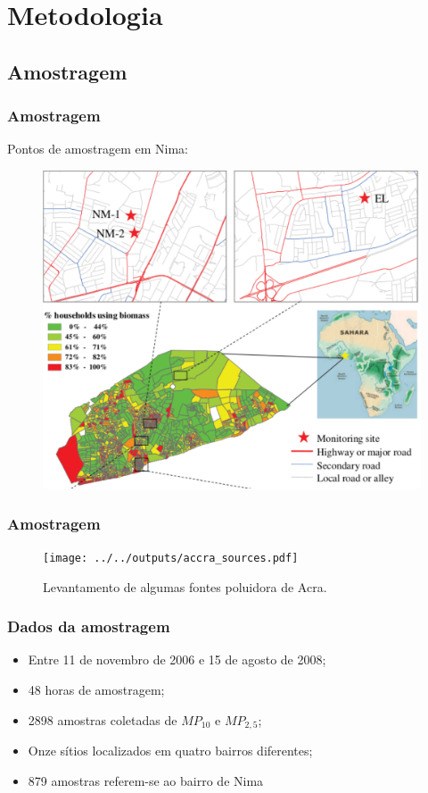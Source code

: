 \section{Metodologia}

\subsection{Amostragem}
\begin{frame}
  \frametitle{Amostragem}
 \begin{center}
  Pontos de amostragem em Nima:
 \end{center}
  \begin{figure}[H]
    \centering
    \includegraphics[scale=0.35]{../../inputs/images/zheng/nima_mapa.pdf}
  \end{figure}
\end{frame}

\begin{frame}
  \frametitle{Amostragem}
  \begin{figure}[H]
  \centering	
  \texttt{[image: ../../outputs/accra\_sources.pdf]}
  \caption{Levantamento de algumas fontes poluidora de Acra.
           \label{fg:acrasources}}
 \end{figure}
\end{frame}

\begin{frame}
  \frametitle{Dados da amostragem}
  \begin{itemize}
    \item Entre 11 de novembro de 2006 e 15 de agosto de 2008;
    \item 48 horas de amostragem;
    \item 2898 amostras coletadas de $MP_{10}$ e $MP_{2,5}$;
    \item Onze sítios localizados em quatro bairros diferentes;
    \item 879 amostras referem-se ao bairro de Nima
  \end{itemize}
\end{frame}

